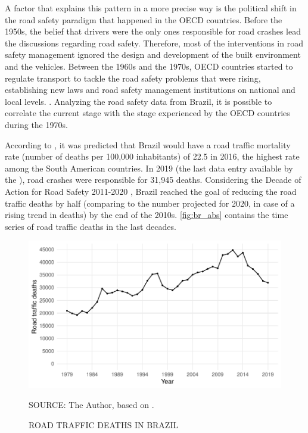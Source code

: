 A factor that explains this pattern in a more precise way is the political shift in the road safety paradigm that happened in the OECD countries. Before the 1950s, the belief that drivers were the only ones responsible for road crashes lead the discussions regarding road safety. Therefore, most of the interventions in road safety management ignored the design and development of the built environment and the vehicles. Between the 1960s and the 1970s, OECD countries started to regulate transport to tackle the road safety problems that were rising, establishing new laws and road safety management institutions on national and local levels. \cite{Bhalla2016}. Analyzing the road safety data from Brazil, it is possible to correlate the current stage with the stage experienced by the OECD countries during the 1970s.

According to \textcite{WHO2018}, it was predicted that Brazil would have a road traffic mortality rate (number of deaths per 100,000 inhabitants) of 22.5 in 2016, the highest rate among the South American countries. In 2019 (the last data entry available by the \textcite{MinistryofHealth2020}), road crashes were responsible for 31,945 deaths. Considering the Decade of Action for Road Safety 2011-2020 \cite{WHO2011}, Brazil reached the goal of reducing the road traffic deaths by half (comparing to the number projected for 2020, in case of a rising trend in deaths) by the end of the 2010s. \autoref{fig:br_abs} contains the time series of road traffic deaths in the last decades.  

\begin{figure}[!htbp]
    \centering\footnotesize
    \captionsetup{font=footnotesize}
    \caption{ROAD TRAFFIC DEATHS IN BRAZIL}
    \includegraphics{fig/brazil_abs.pdf}
    \label{fig:br_abs}
    \par SOURCE: The Author, based on \textcite{MinistryofHealth2020}.
\end{figure}

